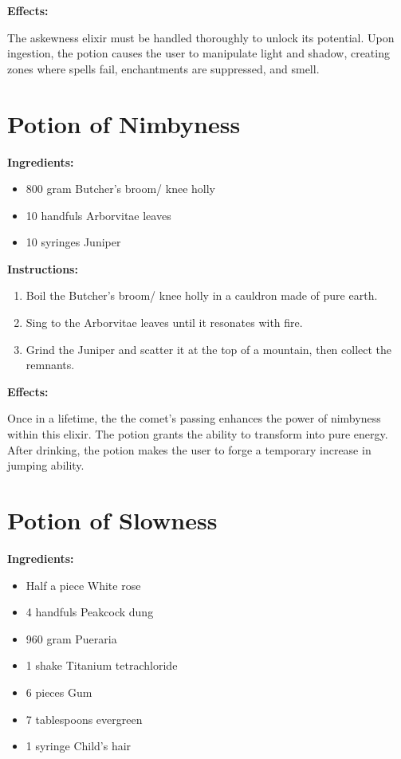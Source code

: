\documentclass{article}
\begin{document}
\textbf{Effects:}

The askewness elixir must be handled thoroughly to unlock its potential. Upon ingestion, the potion causes the user to manipulate light and shadow, creating zones where spells fail, enchantments are suppressed, and smell.

\newpage
\section*{Potion of Nimbyness}

\textbf{Ingredients:}

\begin{itemize}
  \item 800 gram Butcher's broom/ knee holly
  \item 10 handfuls Arborvitae leaves
  \item 10 syringes Juniper
\end{itemize}

\textbf{Instructions:}

\begin{enumerate}
  \item Boil the Butcher's broom/ knee holly in a cauldron made of pure earth.
  \item Sing to the Arborvitae leaves until it resonates with fire.
  \item Grind the Juniper and scatter it at the top of a mountain, then collect the remnants.
\end{enumerate}

\textbf{Effects:}

Once in a lifetime, the the comet’s passing enhances the power of nimbyness within this elixir. The potion grants the ability to transform into pure energy. After drinking, the potion makes the user to forge a temporary increase in jumping ability.

\newpage
\section*{Potion of Slowness}

\textbf{Ingredients:}

\begin{itemize}
  \item Half a piece White rose
  \item 4 handfuls Peakcock dung
  \item 960 gram Pueraria
  \item 1 shake Titanium tetrachloride
  \item 6 pieces Gum
  \item 7 tablespoons evergreen
  \item 1 syringe Child's hair
\end{itemize}
\end{document}
